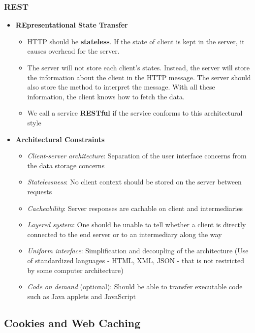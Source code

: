 \subsubsection{REST}
\begin{itemize}
	\item \textbf{REpresentational State Transfer}
	\begin{itemize}
		\item HTTP should be \textbf{stateless}. If the state of client is kept in the server, it causes overhead for the server.
		\item The server will not store each client's states. Instead, the server will store the information about the client in the HTTP message. The server should also store the method to interpret the message. With all these information, the client knows how to fetch the data.
		\item We call a service \textbf{RESTful} if the service conforms to this architectural style
	\end{itemize}
	\item \textbf{Architectural Constraints}
	\begin{itemize}
		\item \textit{Client-server architecture}: Separation of the user interface concerns from the data storage concerns
		\item \textit{Statelessness}: No client context should be stored on the server between requests
		\item \textit{Cacheability}: Server responses are cachable on client and intermediaries
		\item \textit{Layered system}: One should be unable to tell whether a client is directly connected to the end server or to an intermediary along the way
		\item \textit{Uniform interface}: Simplification and decoupling of the architecture (Use of standardized languages - HTML, XML, JSON - that is not restricted by some computer architecture)
		\item \textit{Code on demand} (optional): Should be able to transfer executable code such as Java applets and JavaScript
	\end{itemize}
\end{itemize}

\subsection{Cookies and Web Caching}
